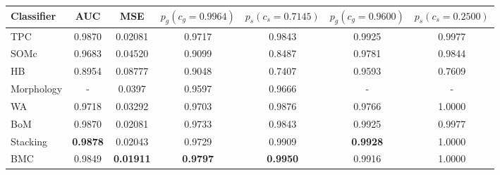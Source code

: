 \begin{tabular}{l c c c c c c}
    Classifier & AUC & MSE &
    $p_{g}\left(c_g=0.9964\right)$ & $p_{s}\left(c_s=0.7145\right)$ &
    $p_{g}\left(c_g=0.9600\right)$ & $p_{s}\left(c_s=0.2500\right)$ \\
    \hline
    TPC  & 0.9870 & 0.02081 & 0.9717 & 0.9843 & 0.9925 & 0.9977\\
    SOMc & 0.9683 & 0.04520 & 0.9099 & 0.8487 & 0.9781 & 0.9844\\
    HB   & 0.8954 & 0.08777 & 0.9048 & 0.7407 & 0.9593 & 0.7609\\
    Morphology   & -      & 0.0397 & 0.9597 & 0.9666 & - & -\\
    WA   & 0.9718 & 0.03292 & 0.9703 & 0.9876 & 0.9766 & 1.0000\\
    BoM  & 0.9870 & 0.02081 & 0.9733 & 0.9843 & 0.9925 & 0.9977\\
    Stacking  & \textbf{0.9878} & 0.02043 & 0.9729 & 0.9909 &
    \textbf{0.9928} & 1.0000\\
    BMC  & 0.9849 & \textbf{0.01911} & \textbf{0.9797} & \textbf{0.9950} &
    0.9916 & 1.0000\\
\end{tabular}
